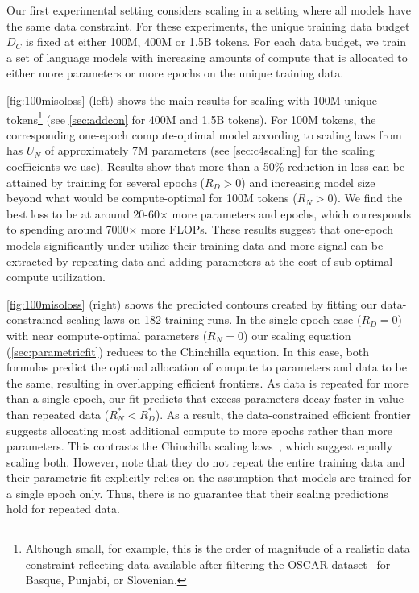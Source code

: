 \documentclass{article}
\begin{document}
Our first experimental setting considers scaling in a setting where all models have the same data constraint.
For these experiments,  the unique training data budget $D_C$ is fixed at either 100M, 400M or 1.5B tokens. For each data budget, we train a set of language models with increasing amounts of compute that is allocated to either more parameters or more epochs on the unique training data. 

\autoref{fig:100misoloss} (left) shows the main results for scaling with 100M unique tokens\footnote{Although small, for example, this is the order of magnitude of a realistic data constraint reflecting data available after filtering the OSCAR dataset~\citep{OrtizSuarezSagotRomary2019} for Basque, Punjabi, or Slovenian.} (see \autoref{sec:addcon} for 400M and 1.5B tokens). For 100M tokens, the corresponding one-epoch compute-optimal model according to scaling laws from~\cite{hoffmann2022training} has $U_N$ of approximately 7M parameters (see \autoref{sec:c4scaling} for the scaling coefficients we use). 
Results show that more than a 50\% reduction in loss can be attained by training for several epochs ($R_D>0$) and increasing model size beyond what would be compute-optimal for 100M tokens ($R_N>0$). We find the best loss to be at around 20-60$\times$ more parameters and epochs, which corresponds to spending around 7000$\times$ more FLOPs. These results suggest that one-epoch models significantly under-utilize their training data and more signal can be extracted by repeating data and adding parameters at the cost of sub-optimal compute utilization. 

\autoref{fig:100misoloss} (right) shows the predicted contours created by fitting our data-constrained scaling laws on 182 training runs. In the single-epoch case ($R_D=0$) with near compute-optimal parameters ($R_N=0$) our scaling equation (\autoref{sec:parametricfit}) reduces to the Chinchilla equation. In this case, both formulas predict the optimal allocation of compute to parameters and data to be the same, resulting in overlapping efficient frontiers. As data is repeated for more than a single epoch, our fit predicts that excess parameters decay faster in value than repeated data ($R_N^*<R_D^*$). As a result, the data-constrained efficient frontier suggests allocating most additional compute to more epochs rather than more parameters. This contrasts the Chinchilla scaling laws~\cite{hoffmann2022training}, which suggest equally scaling both. However, note that they do not repeat the entire training data and their parametric fit explicitly relies on the assumption that models are trained for a single epoch only. Thus, there is no guarantee that their scaling predictions hold for repeated data.
\end{document}
